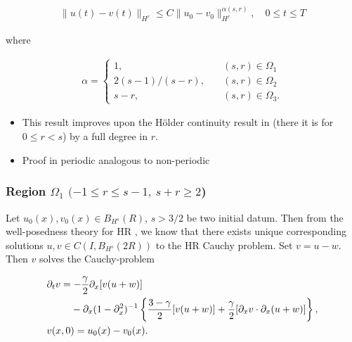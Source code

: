 \documentclass{beamer}
\numberwithin{equation}{section}
\newcommand{\p}{\partial}
\begin{document}
\begin{frame}
    \begin{theorem}

\begin{equation*}
\begin{split}
  \| u(t) - v(t) \|_{H^{r}} \le C \| u_{0} - v_{0} \|_{H^{r}}^{\alpha(s, r)},
  \quad 0
  \le t \le T
\end{split}
\end{equation*}


where 


\begin{equation*}
\begin{split}
\alpha = 
\begin{cases}
   1, \quad & (s,r) \in \Omega_{1} 
  \\
   2(s-1)/(s-r),  \quad & (s, r) \in \Omega_{2}
  \\
   s-r, \quad & (s, r) \in \Omega_{3}.
\end{cases}
\end{split}
\end{equation*}
\end{theorem}
\pause
\begin{itemize}
    \item
This result improves upon the H\"older continuity result in
\cite{Chen:2011fk} (there it is for $0 \le r < s$) by a full degree in $r$. 
\item Proof in periodic analogous to non-periodic
\end{itemize}

\end{frame}

\begin{frame}


\frametitle{Region $\Omega_{1}$ $(-1 \le r \le s-1, \ s + r \ge 2$)} 

Let $u_{0}(x), v_{0}(x)
\in B_{H^{s}}(R)$, $s > 3/2$ be two initial datum. Then from
the well-posedness theory for HR \cite{Karapetyan:2010fk}, we
know that there exists unique corresponding solutions $u, v \in C(I,
B_{H^{s}}(2R))$ to the HR Cauchy problem.
Set $v=u-w$. Then $v$ solves the Cauchy-problem

\pause
\begin{align*}
& \p_t v
=  -\frac{\gamma}{2} \p_x [v(u + w)] 
\\
\notag
& \phantom{\p_t v = }-\p_x (1 - \p_{x}^{2})^{-1} \left\{
\frac{3-\gamma}{2}[v(u+w)] + \frac{\gamma}{2}[\p_x v \cdot \p_x (u+w)]
\right\},
\\
& v(x,0) = u_{0}(x) - v_{0}(x).
\end{align*}
\end{frame}
\end{document}
